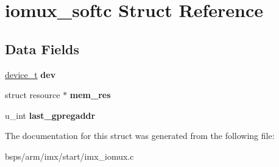 \hypertarget{structiomux__softc}{}\section{iomux\+\_\+softc Struct Reference}
\label{structiomux__softc}
\subsection*{Data Fields}
\begin{DoxyCompactItemize}
\item 
\mbox{\label{structiomux__softc_a9005a1bc2b3078ec1266e3722860ab64}} 
\mbox{\hyperlink{structdevice}{device\+\_\+t}} {\bfseries dev}
\item 
\mbox{\label{structiomux__softc_abdf7a2279661c2027dc7cf5e43283e31}} 
struct resource $\ast$ {\bfseries mem\+\_\+res}
\item 
\mbox{\label{structiomux__softc_a91feaab818233d65a7ed3a1c61d4f1ec}} 
u\+\_\+int {\bfseries last\+\_\+gpregaddr}
\end{DoxyCompactItemize}


The documentation for this struct was generated from the following file\+:\begin{DoxyCompactItemize}
\item 
bsps/arm/imx/start/imx\+\_\+iomux.\+c\end{DoxyCompactItemize}
